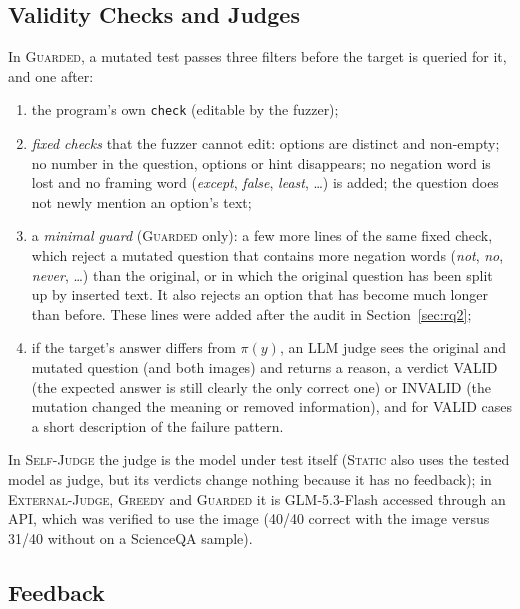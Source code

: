 \documentclass[sigconf]{acmart}
\newcommand{\HW}{\textsc{Static}}
\newcommand{\SJ}{\textsc{Self-Judge}}
\newcommand{\OJ}{\textsc{External-Judge}}
\newcommand{\BOLD}{\textsc{Greedy}}
\newcommand{\BR}{\textsc{Guarded}}
\begin{document}
\subsection{Validity Checks and Judges}

In \BR{}, a mutated test passes three filters before the target is queried for it, and one after:
\begin{enumerate}[leftmargin=*]
  \item the program's own \texttt{check} (editable by the fuzzer);
  \item \emph{fixed checks} that the fuzzer cannot edit: options are distinct and non-empty; no number in the question,
        options or hint disappears; no negation word is lost and no framing word (\emph{except}, \emph{false},
        \emph{least}, \dots) is added; the question does not newly mention an option's text;
  \item a \emph{minimal guard} (\BR{} only): a few more lines of the same fixed check, which reject a mutated
        question that contains more negation words (\emph{not}, \emph{no}, \emph{never}, \dots) than the original, or
        in which the original question has been split up by inserted text. It also rejects an option that has become
        much longer than before. These lines were added after the audit in Section~\ref{sec:rq2};
  \item if the target's answer differs from $\pi(y)$, an LLM judge sees the original and mutated question (and both
        images) and returns a reason, a verdict VALID (the expected answer is still clearly the only correct one) or
        INVALID (the mutation changed the meaning or removed information), and for VALID cases a short description of
        the failure pattern.
\end{enumerate}
In \SJ{} the judge is the model under test itself (\HW{} also uses the tested model as judge, but its verdicts change
nothing because it has no feedback); in \OJ{}, \BOLD{} and \BR{} it is GLM-5.3-Flash accessed through an API, which was verified to use the image (40/40 correct with the image versus 31/40 without on a ScienceQA sample).

\subsection{Feedback}
\end{document}
